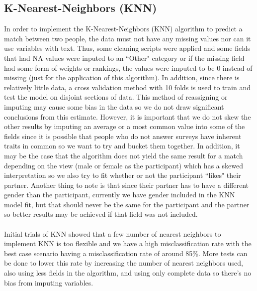 \documentclass{article}
\begin{document}
\subsection{K-Nearest-Neighbors (KNN)}
In order to implement the K-Nearest-Neighbors (KNN) algorithm to predict a match between two people, the data must not have any missing values nor can it use variables with text.  Thus, some cleaning scripts were applied and some fields that had NA values were inputed to an ``Other" category or if the missing field had some form of weights or rankings, the values were imputed to be 0 instead of missing (just for the application of this algorithm).  In addition, since there is relatively little data, a cross validation method with 10 folds is used to train and test the model on disjoint sections of data.  This method of reassigning or imputing may cause some bias in the data so we do not draw significant conclusions from this estimate.  However, it is important that we do not skew the other results by imputing an average or a most common value into some of the fields since it is possible that people who do not answer surveys have inherent traits in common so we want to try and bucket them together.  In addition, it may be the case that the algorithm does not yield the same result for a match depending on the view (male or female as the participant) which has a skewed interpretation so we also try to fit whether or not the participant ``likes" their partner.  Another thing to note is that since their partner has to have a different gender than the participant, currently we have gender included in the KNN model fit, but that should never be the same for the participant and the partner so better results may be achieved if that field was not included.\\
\null\\
Initial trials of KNN showed that a few number of nearest neighbors to implement KNN is too flexible and we have a high misclassification rate with the best case scenario having a misclassification rate of around 85\%.  More tests can be done to lower this rate by increasing the number of nearest neighbors used, also using less fields in the algorithm, and using only complete data so there's no bias from imputing variables.
%
\end{document}
